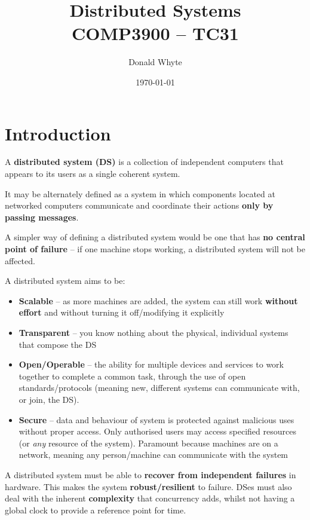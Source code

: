 \documentclass{article}
\title{Distributed Systems \\ COMP3900 -- TC31}
\author{Donald Whyte}
\date{\today}
\begin{document}
\maketitle

\tableofcontents

\pagebreak
\listoffigures

\pagebreak
\listoftables

\pagebreak


\section{Introduction}
A \textbf{distributed system (DS)} is a collection of independent computers that appears to its users as a single coherent system. 

It may be alternately defined as a system in which components located at networked computers communicate and coordinate their actions \textbf{only by passing messages}.

A simpler way of defining a distributed system would be one that has \textbf{no central point of failure} -- if one machine stops working, a distributed system will not be affected.

A distributed system aims to be:
\begin{itemize}
	\item \textbf{Scalable} -- as more machines are added, the system can still work \textbf{without effort} and without turning it off/modifying it explicitly
	\item \textbf{Transparent} -- you know nothing about the physical, individual systems that compose the DS
	\item \textbf{Open/Operable} -- the ability for multiple devices and services to work together to complete a common task, through the use of open standards/protocols (meaning new, different systems can communicate with, or join, the DS).
	\item \textbf{Secure} -- data and behaviour of system is protected against malicious uses without proper access. Only authorised users may access specified resources (or \textit{any} resource of the system). Paramount because machines are on a network, meaning any person/machine can communicate with the system
\end{itemize}

A distributed system must be able to \textbf{recover from independent failures} in hardware. This makes the system \textbf{robust/resilient} to failure. DSes must also deal with the inherent \textbf{complexity} that concurrency adds, whilst not having a global clock to provide a reference point for time.
\end{document}
